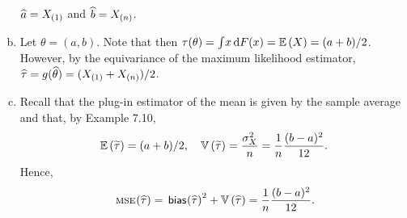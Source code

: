 \begin{ex}
\begin{enumerate}[(a)]
          $\widehat{a}= X_{(1)}$ and $\widehat{b}= X_{(n)}$.
    \item Let $\theta=(a, b)$. Note that then
          $\tau(\theta)=\int\!x\,\mathrm{d}{F}(x)=\mathbb{E}\left(X\right)=(a+b)/2$. However, by the
          equivariance of the maximum likelihood estimator, $\widehat{\tau}
            =g(\widehat{\theta})=(X_{(1)}+X_{(n)})/2$.
    \item Recall that the plug-in estimator of the mean is given by the sample
          average and that, by Example 7.10,
          \[
            \mathbb{E}\left(\widetilde{\tau}\right)   = (a + b) / 2,\quad
            \mathbb{V}\left(\widetilde{\tau}\right) = \frac{\sigma^2_X}{n}
            =\frac{1}{n}\frac{(b-a)^2}{12}.
          \]
          Hence,
          \[
            \,\textsc{mse}\mkern-2mu\left(\widehat{\tau} \right)
            =\,\textsf{bias}\mkern-2mu\left(\widehat{\tau} \right)^2
            +\mathbb{V}\left(\widehat{\tau}\right)
            =\frac{1}{n}\frac{(b-a)^2}{12}.
          \]
          \inputminted{python}{../code/09-02.py}
          \inputminted{text}{../output/09-02.txt}
  \end{enumerate}
\end{ex}

